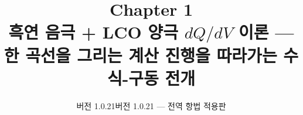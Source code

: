 

\title{\textbf{\LARGE Chapter 1}\\[0.35em]\Large 흑연 음극 + LCO 양극 $dQ/dV$ 이론 --- 한 곡선을 그리는 계산 진행을 따라가는 수식-구동 전개}
\author{}
\date{\normalsize 버전 1.0.21}
\ifnavaid\date{\normalsize 버전 1.0.21 --- 전역 항법 적용판}\fi


\maketitle
























\ifnavaid
  
\fi


